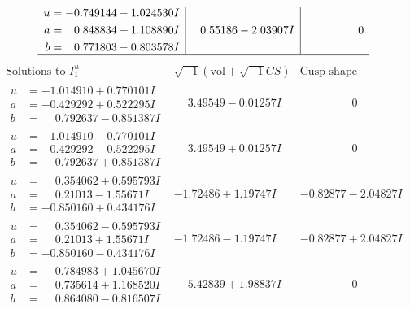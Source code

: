 \documentclass[1p]{elsarticle_modified}
\theoremstyle{definition}
\newcommand{\I}{\sqrt{-1}}
\begin{document}
$$\begin{array}{c|c|c}
\begin{aligned}
u &= -0.749144 - 1.024530 I \\
a &= \phantom{-}0.848834 + 1.108890 I \\
b &= \phantom{-}0.771803 - 0.803578 I\end{aligned}
 & \phantom{-}0.55186 - 2.03907 I & \phantom{-0.000000 } 0\\
 \hline 
 \end{array}$$\newpage$$\begin{array}{c|c|c}  
\text{Solutions to }I^u_{1}& \I (\text{vol} + \sqrt{-1}CS) & \text{Cusp shape}\\
 \hline 
\begin{aligned}
u &= -1.014910 + 0.770101 I \\
a &= -0.429292 + 0.522295 I \\
b &= \phantom{-}0.792637 - 0.851387 I\end{aligned}
 & \phantom{-}3.49549 - 0.01257 I & \phantom{-0.000000 } 0 \\ \hline\begin{aligned}
u &= -1.014910 - 0.770101 I \\
a &= -0.429292 - 0.522295 I \\
b &= \phantom{-}0.792637 + 0.851387 I\end{aligned}
 & \phantom{-}3.49549 + 0.01257 I & \phantom{-0.000000 } 0 \\ \hline\begin{aligned}
u &= \phantom{-}0.354062 + 0.595793 I \\
a &= \phantom{-}0.21013 - 1.55671 I \\
b &= -0.850160 + 0.434176 I\end{aligned}
 & -1.72486 + 1.19747 I & -0.82877 - 2.04827 I \\ \hline\begin{aligned}
u &= \phantom{-}0.354062 - 0.595793 I \\
a &= \phantom{-}0.21013 + 1.55671 I \\
b &= -0.850160 - 0.434176 I\end{aligned}
 & -1.72486 - 1.19747 I & -0.82877 + 2.04827 I \\ \hline\begin{aligned}
u &= \phantom{-}0.784983 + 1.045670 I \\
a &= \phantom{-}0.735614 + 1.168520 I \\
b &= \phantom{-}0.864080 - 0.816507 I\end{aligned}
 & \phantom{-}5.42839 + 1.98837 I & \phantom{-0.000000 } 0 \\ \hline\begin{aligned}

\end{aligned}
\end{array}$$
\end{document}
